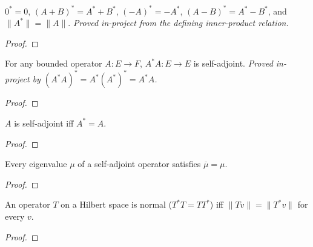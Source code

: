 \begin{theorem}
  \label{thm:adjoint-linear-laws}
  \leanok
  $0^{*} = 0$, $(A + B)^{*} = A^{*} + B^{*}$,
  $(-A)^{*} = -A^{*}$, $(A - B)^{*} = A^{*} - B^{*}$, and
  $\|A^{*}\| = \|A\|$.
  \emph{Proved in-project from the defining inner-product relation.}
\end{theorem}
\begin{proof}
  \leanok
\end{proof}

\begin{theorem}
  \label{thm:adjoint-self-comp}
  \leanok
  For any bounded operator $A\colon E \to F$, $A^{*}A\colon E \to E$ is
  self-adjoint. \emph{Proved in-project by
  $(A^{*}A)^{*} = A^{*}(A^{*})^{*} = A^{*}A$.}
\end{theorem}
\begin{proof}
  \leanok
\end{proof}

\begin{theorem}[Rudin 12.12, self-adjoint iff $A^{*} = A$]
  \label{thm:self-adjoint-iff}
  \leanok
  $A$ is self-adjoint iff $A^{*} = A$.
\end{theorem}
\begin{proof}
  \leanok
\end{proof}

\begin{theorem}
  \label{thm:self-adjoint-real-eigenvalue}
  \leanok
  Every eigenvalue $\mu$ of a self-adjoint operator satisfies
  $\overline{\mu} = \mu$.
\end{theorem}
\begin{proof}
  \leanok
\end{proof}

\begin{theorem}
  \label{thm:normal-iff}
  \leanok
  An operator $T$ on a Hilbert space is normal ($T^{*}T = T T^{*}$)
  iff $\|T v\| = \|T^{*} v\|$ for every $v$.
\end{theorem}
\begin{proof}
  \leanok
\end{proof}

